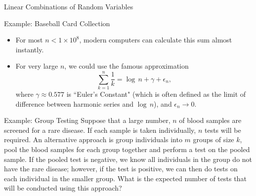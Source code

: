 \begin{frame}[allowframebreaks]{Linear Combinations of Random Variables}
\begin{exampleblock}{Example: Baseball Card Collection}
{\begin{itemize}
    \item For most $n < 1\times 10^8$, modern computers can calculate this sum almost instantly.
    \item For very large $n$, we could use the famous approximation
    $$
    \sum_{k = 1}^n \frac{1}{k} = \log\,n + \gamma + \epsilon_n,
    $$
    where $\gamma \approx 0.577$ is ``Euler's Constant" (which is often defined as the limit of difference between harmonic series and $\log\, n$), and $\epsilon_n \rightarrow 0$. 
  \end{itemize}
  }
  
\end{exampleblock}


\framebreak

\begin{exampleblock}{Example: Group Testing}
  Suppose that a large number, $n$ of blood samples are screened for a rare disease. If each sample is taken individually, $n$ tests will be required. An alternative approach is group individuals into $m$ groups of size $k$, pool the blood samples for each group together and perform a test on the pooled sample. If the pooled test is negative, we know all individuals in the group do not have the rare disease; however, if the test is positive, we can then do tests on each individual in the smaller group. What is the expected number of tests that will be conducted using this approach?
  

\end{exampleblock}
\end{frame}
